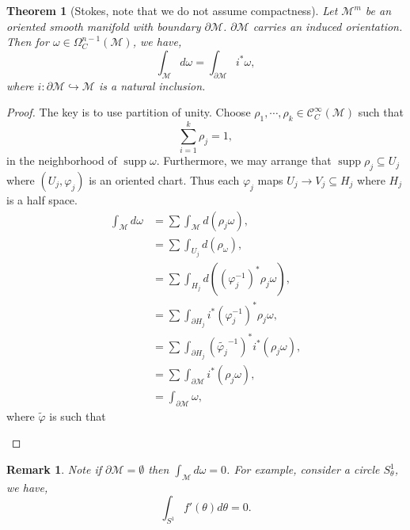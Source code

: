 \documentclass[8pt]{article}
\newtheorem{theorem}{Theorem} [section]
\newtheorem{remark}{Remark}[section]
\DeclareMathOperator{\supp}{supp}
\newcommand{\M}[0]{\mathcal{M}}
\newcommand{\cinf}[0]{\mathcal{C}^\infty}
\begin{document}
\begin{theorem}[Stokes, note that we do not assume compactness]
  Let $\M^m$ be an oriented smooth manifold with boundary $\partial\M$. $\partial\M$ carries an induced orientation. Then for $\omega\in\Omega_C^{n-1}(\M)$, we have, 
  \begin{equation*}
    \int_\M d\omega = \int_{\partial \M}i^*\omega, 
  \end{equation*}
  where $i:\partial\M\hookrightarrow\M$ is a natural inclusion.
\end{theorem}

\begin{proof}
  The key is to use partition of unity. Choose $\rho_1,\cdots,\rho_k\in\cinf_C(\M)$ such that 
  \begin{equation*}
    \sum_{i=1}^k \rho_j = 1,
  \end{equation*}
  in the neighborhood of $\supp\omega$. Furthermore, we  may arrange that $\supp\rho_j\subseteq U_j$ where $(U_j,\varphi_j)$ is an oriented chart. Thus each $\varphi_j$ maps $U_j\to V_j\subseteq H_j$ where $H_j$ is a half space.
  \begin{align*}
    \int_\M d\omega & = \sum\int_\M d(\rho_j\omega),\\
    &= \sum\int_{U_j}d(\rho_\omega),\\
    & = \sum\int_{H_j}d((\varphi_j^{-1})^*\rho_j\omega),\\
    & = \sum\int_{\partial H_j}i^*(\varphi_j^{-1})^*\rho_j\omega,\\
    & = \sum\int_{\partial H_j}(\tilde{\varphi_j}^{-1})^*i^*(\rho_j\omega),\\
    & = \sum\int_{\partial\M}i^*(\rho_j\omega),\\
    & = \int_{\partial\M}\omega,
  \end{align*}
  where $\tilde{\varphi}$ is such that 
  \begin{center}
  \end{center}
\end{proof}

\begin{remark}
  Note if $\partial\M=\emptyset$ then $\int_\M d\omega = 0$. For example, consider a circle $S^1_\theta$, we have,
  \begin{equation*}
    \int_{S^1}f'(\theta)d\theta = 0.
  \end{equation*}
\end{remark}
\end{document}
